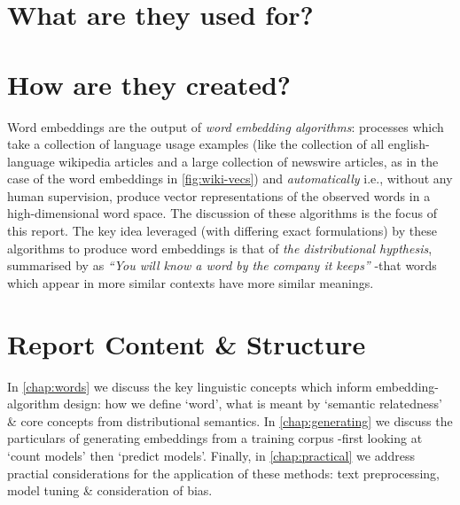 \documentclass{ucetd}
\begin{document}
\section*{What are they used for?}

\section*{How are they created?}
Word embeddings are the output of \emph{word embedding algorithms}: processes which take a collection of language usage examples (like the collection of all english-language wikipedia articles and a large collection of newswire articles, as in the case of the word embeddings in \autoref{fig:wiki-vecs}) and \emph{automatically} i.e., without any human supervision, produce vector representations of the observed words in a high-dimensional word space. The discussion of these algorithms is the focus of this report. The key idea leveraged (with differing exact formulations) by these algorithms to produce word embeddings is that of \emph{the distributional hypthesis}, summarised by \textcite{firth-1957-a-syn-of-lin} as \emph{``You will know a word by the company it keeps''} -that words which appear in more similar contexts have more similar meanings. 



\section*{Report Content \& Structure}
In \autoref{chap:words} we discuss the key linguistic concepts which inform embedding-algorithm design: how we define `word', what is meant by `semantic relatedness' \& core concepts from distributional semantics. In \autoref{chap:generating} we discuss the particulars of generating embeddings from a training corpus -first looking at `count models' then `predict models'. Finally, in \autoref{chap:practical} we address practial considerations for the application of these methods: text preprocessing, model tuning \& consideration of bias.
\end{document}
